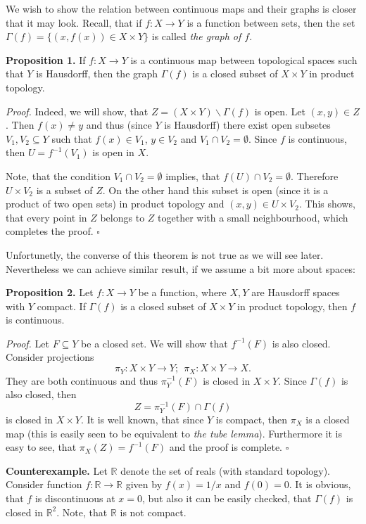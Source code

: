 \documentclass[12pt]{article}
\begin{document}
We wish to show the relation between continuous maps and their graphs is closer that it may look. Recall, that if $f:X\to Y$ is a function between sets, then the set $\Gamma(f)=\{(x,f(x))\in X\times Y\}$ is called \textit{the graph of $f$}.

\textbf{Proposition 1.} If $f:X\to Y$ is a continuous map between topological spaces such that $Y$ is Hausdorff, then the graph $\Gamma(f)$ is a closed subset of $X\times Y$ in product topology.

\textit{Proof.} Indeed, we will show, that $Z=(X\times Y)\backslash\Gamma(f)$ is open. Let $(x,y)\in Z$. Then $f(x)\neq y$ and thus (since $Y$ is Hausdorff) there exist open subsetes $V_1, V_2\subseteq Y$ such that $f(x)\in V_1$, $y\in V_2$ and $V_1\cap V_2=\emptyset$. Since $f$ is continuous, then $U=f^{-1}(V_1)$ is open in $X$.

Note, that the condition $V_1\cap V_2=\emptyset$ implies, that  $f(U)\cap V_2=\emptyset$. Therefore $U\times V_2$ is a subset of $Z$. On the other hand this subset is open (since it is a product of two open sets) in product topology and $(x,y)\in U\times V_2$. This shows, that every point in $Z$ belongs to $Z$ together with a small neighbourhood, which completes the proof. $\square$

Unfortunetly, the converse of this theorem is not true as we will see later. Nevertheless we can achieve similar result, if we assume a bit more about spaces:

\textbf{Proposition 2.} Let $f:X\to Y$ be a function, where $X,Y$ are Hausdorff spaces with $Y$ compact. If $\Gamma(f)$ is a closed subset of $X\times Y$ in product topology, then $f$ is continuous.

\textit{Proof.} Let $F\subseteq Y$ be a closed set. We will show that $f^{-1}(F)$ is also closed. Consider projections 
$$\pi_Y:X\times Y\to Y; \ \ \pi_X:X\times Y\to X.$$
They are both continuous and thus $\pi_Y^{-1}(F)$ is closed in $X\times Y$. Since $\Gamma(f)$ is also closed, then
$$Z=\pi_Y^{-1}(F)\cap\Gamma(f)$$
is closed in $X\times Y$. It is well known, that since $Y$ is compact, then $\pi_X$ is a closed map (this is easily seen to be equivalent to \textit{the tube lemma}). Furthermore it is easy to see, that $\pi_X(Z)=f^{-1}(F)$ and the proof is complete. $\square$

\textbf{Counterexample.} Let $\mathbb{R}$ denote the set of reals (with standard topology). Consider function $f:\mathbb{R}\to\mathbb{R}$ given by $f(x)=1/x$ and $f(0)=0$. It is obvious, that $f$ is discontinuous at $x=0$, but also it can be easily checked, that $\Gamma(f)$ is closed in $\mathbb{R}^2$. Note, that $\mathbb{R}$ is not compact.
\end{document}
